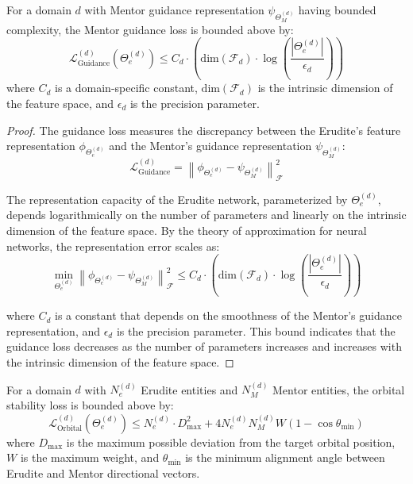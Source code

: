 \begin{theorem}
For a domain $d$ with Mentor guidance representation $\psi_{\Theta_M^{(d)}}$ having bounded complexity, the Mentor guidance loss is bounded above by:
\begin{equation}
\mathcal{L}_{\text{Guidance}}^{(d)}(\Theta_e^{(d)}) \leq C_d \cdot \left(\text{dim}(\mathcal{F}_d) \cdot \log\left(\frac{|\Theta_e^{(d)}|}{\epsilon_d}\right)\right)
\end{equation}
where $C_d$ is a domain-specific constant, $\text{dim}(\mathcal{F}_d)$ is the intrinsic dimension of the feature space, and $\epsilon_d$ is the precision parameter.
\end{theorem}

\begin{proof}
The guidance loss measures the discrepancy between the Erudite's feature representation $\phi_{\Theta_e^{(d)}}$ and the Mentor's guidance representation $\psi_{\Theta_M^{(d)}}$:
\begin{equation}
\mathcal{L}_{\text{Guidance}}^{(d)} = \left\|\phi_{\Theta_e^{(d)}} - \psi_{\Theta_M^{(d)}}\right\|^2_{\mathcal{F}}
\end{equation}

The representation capacity of the Erudite network, parameterized by $\Theta_e^{(d)}$, depends logarithmically on the number of parameters and linearly on the intrinsic dimension of the feature space. By the theory of approximation for neural networks, the representation error scales as:
\begin{equation}
\min_{\Theta_e^{(d)}} \left\|\phi_{\Theta_e^{(d)}} - \psi_{\Theta_M^{(d)}}\right\|^2_{\mathcal{F}} \leq C_d \cdot \left(\text{dim}(\mathcal{F}_d) \cdot \log\left(\frac{|\Theta_e^{(d)}|}{\epsilon_d}\right)\right)
\end{equation}

where $C_d$ is a constant that depends on the smoothness of the Mentor's guidance representation, and $\epsilon_d$ is the precision parameter. This bound indicates that the guidance loss decreases as the number of parameters increases and increases with the intrinsic dimension of the feature space.
\end{proof}

\begin{theorem}
For a domain $d$ with $N_e^{(d)}$ Erudite entities and $N_M^{(d)}$ Mentor entities, the orbital stability loss is bounded above by:
\begin{equation}
\mathcal{L}_{\text{Orbital}}^{(d)}(\Theta_e^{(d)}) \leq N_e^{(d)} \cdot D_{\text{max}}^2 + 4N_e^{(d)}N_M^{(d)}W(1 - \cos\theta_{\text{min}})
\end{equation}
where $D_{\text{max}}$ is the maximum possible deviation from the target orbital position, $W$ is the maximum weight, and $\theta_{\text{min}}$ is the minimum alignment angle between Erudite and Mentor directional vectors.
\end{theorem}

